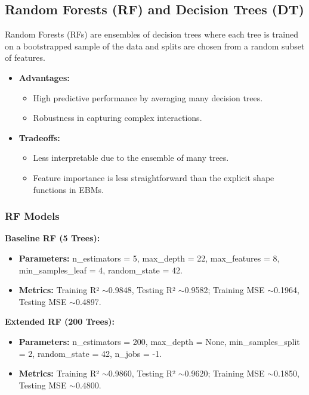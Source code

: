 \documentclass{article}
\begin{document}
\subsection{Random Forests (RF) and Decision Trees (DT)}
Random Forests (RFs) are ensembles of decision trees where each tree is trained on a bootstrapped sample of the data and splits are chosen from a random subset of features.
\begin{itemize}
    \item \textbf{Advantages:}
        \begin{itemize}
            \item High predictive performance by averaging many decision trees.
            \item Robustness in capturing complex interactions.
        \end{itemize}
    \item \textbf{Tradeoffs:}
        \begin{itemize}
            \item Less interpretable due to the ensemble of many trees.
            \item Feature importance is less straightforward than the explicit shape functions in EBMs.
        \end{itemize}
\end{itemize}

\subsubsection*{RF Models}
\textbf{Baseline RF (5 Trees):}
\begin{itemize}
    \item \textbf{Parameters:} n\_estimators = 5, max\_depth = 22, max\_features = 8, min\_samples\_leaf = 4, random\_state = 42.
    \item \textbf{Metrics:} Training R² $\sim$0.9848, Testing R² $\sim$0.9582; Training MSE $\sim$0.1964, Testing MSE $\sim$0.4897.
\end{itemize}

\textbf{Extended RF (200 Trees):}
\begin{itemize}
    \item \textbf{Parameters:} n\_estimators = 200, max\_depth = None, min\_samples\_split = 2, random\_state = 42, n\_jobs = -1.
    \item \textbf{Metrics:} Training R² $\sim$0.9860, Testing R² $\sim$0.9620; Training MSE $\sim$0.1850, Testing MSE $\sim$0.4800.
\end{itemize}
\end{document}
